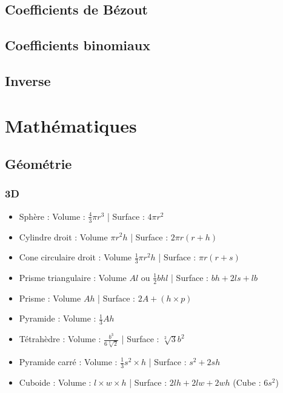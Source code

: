 \documentclass[8pt]{article}
\begin{document}
        \subsection{Coefficients de Bézout}
        {\scriptsize}
        \subsection{Coefficients binomiaux}
        {\scriptsize}
        \subsection{Inverse}
        {\scriptsize}
    \section{Mathématiques}
        \subsection{Géométrie}
            \subsubsection{3D}
            \begin{itemize}
                \item Sphère : Volume : $\frac{4}{3}\pi r^{3}$ | Surface : $4\pi r^{2}$
                \item Cylindre droit : Volume $\pi r^{2} h$ | Surface : $2\pi r( r + h)$
                \item Cone circulaire droit : Volume $\frac{1}{3} \pi r^{2} h$ | Surface : $\pi r( r + s)$
                \item Prisme triangulaire : Volume $A  l$ ou $\frac{1}{2}bhl$ | Surface : $bh + 2ls + lb$
                \item Prisme : Volume $Ah$ | Surface : $2A + (h \times p)$
                \item Pyramide : Volume : $\frac{1}{3}Ah$
                \item Tétrahèdre : Volume : $\frac{b^{3}}{6  \sqrt[2]{2}}$ | Surface : $\sqrt[2]{3}b^{2}$
                \item Pyramide carré : Volume : $\frac{1}{3}s^{2}\times h$ | Surface : $s^{2} + 2sh$
                \item Cuboide : Volume : $l\times w \times h$ | Surface : $2lh + 2lw +2wh$ (Cube : $6s^{2}$)
            \end{itemize}
\end{document}
